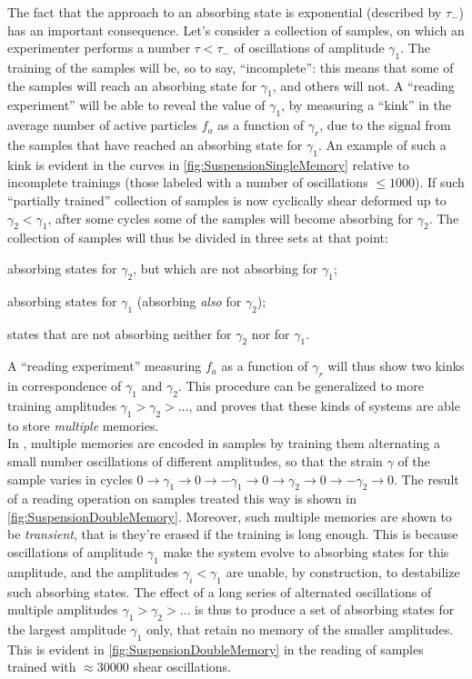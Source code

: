 The fact that the approach to an absorbing state is exponential (described by $\tau_{-}$) has an important consequence. 
Let's consider a collection of samples, on which an experimenter performs a number $\tau < \tau_{-}$ of oscillations of amplitude $\gamma_{1}$. The training of the samples will be, so to say, ``incomplete'': this means that some of the samples will reach an absorbing state for $\gamma_{1}$, and others will not. A ``reading experiment'' will be able to reveal the value of $\gamma_{1}$, by measuring a ``kink'' in the average number of active particles $f_{a}$ as a function of $\gamma_{r}$, due to the signal from the samples that have reached an absorbing state for $\gamma_{1}$. An example of such a kink is evident in the curves in  \autoref{fig:SuspensionSingleMemory} relative to incomplete trainings (those labeled with a number of oscillations $\leq 1000$).
If such ``partially trained'' collection of samples is now cyclically shear deformed up to $\gamma_{2} < \gamma_{1}$, after some cycles some of the samples will become absorbing for $\gamma_{2}$. The collection of samples will thus be divided in three sets at that point:
\begin{enumerate*}[label=\itshape\alph*\upshape)]
	\item absorbing states for $\gamma_{2}$, but which are not absorbing for $\gamma_{1}$;
	\item absorbing states for $\gamma_{1}$ (absorbing \emph{also} for $\gamma_{2}$);
	\item states that are not absorbing neither for $\gamma_{2}$ nor for $\gamma_{1}$.
\end{enumerate*}
A ``reading experiment'' measuring $f_{a}$ as a function of $\gamma_{r}$ will thus show two kinks in correspondence of $\gamma_{1}$ and $\gamma_{2}$. This procedure can be generalized to more training amplitudes $\gamma_{1} > \gamma_{2} > \ldots$, and proves that these kinds of systems are able to store \emph{multiple} memories.\\
In \cite{keim2011generic}, multiple memories are encoded in samples by training them alternating a small number oscillations of different amplitudes, so that the strain $\gamma$ of the sample varies in cycles $0 \rightarrow \gamma_{1} \rightarrow 0 \rightarrow  -\gamma_{1} \rightarrow 0 \rightarrow \gamma_{2} \rightarrow 0 \rightarrow  -\gamma_{2} \rightarrow 0$. The result of a reading operation on samples treated this way is shown in \autoref{fig:SuspensionDoubleMemory}.
Moreover, such multiple memories are shown to be \emph{transient}, that is they're erased if the training is long enough. This is because oscillations of amplitude $\gamma_{1}$ make the system evolve to absorbing states for this amplitude, and the amplitudes $\gamma_{i} < \gamma_{1}$ are unable, by construction, to destabilize such absorbing states. The effect of a long series of alternated oscillations of multiple amplitudes $\gamma_{1} > \gamma_{2} > \ldots$ is thus to produce a set of absorbing states for the largest amplitude $\gamma_{1}$ only, that retain no memory of the smaller amplitudes. This is evident in \autoref{fig:SuspensionDoubleMemory} in the reading of samples trained with $\approx 30000$ shear oscillations.

